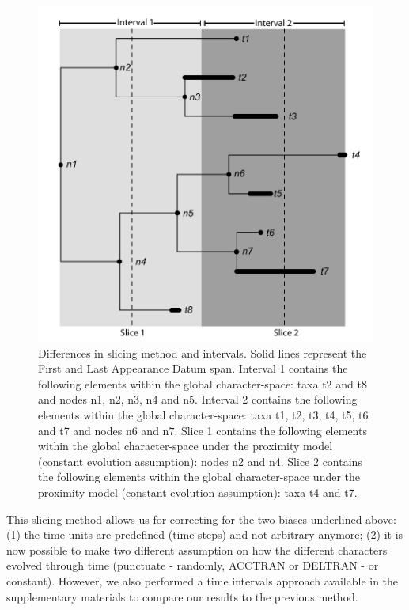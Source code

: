 \documentclass[12pt,letterpaper]{article}
\begin{document}
\begin{figure}[!htbp]
\centering
    \includegraphics[keepaspectratio=true]{Figures/Slicing.pdf}
\caption{Differences in slicing method and intervals. Solid lines represent the First and Last Appearance Datum span. Interval 1 contains the following elements within the global character-space: taxa t2 and t8 and nodes n1, n2, n3, n4 and n5. Interval 2 contains the following elements within the global character-space: taxa t1, t2, t3, t4, t5, t6 and t7 and nodes n6 and n7. Slice 1 contains the following elements within the global character-space under the proximity model (constant evolution assumption): nodes n2 and n4. Slice 2 contains the following elements within the global character-space under the proximity model (constant evolution assumption): taxa t4 and t7.}
\label{slicing}
\end{figure}

This slicing method allows us for correcting for the two biases underlined above: (1) the time units are predefined (time steps) and not arbitrary anymore; (2) it is now possible to make two different assumption on how the different characters evolved through time (punctuate - randomly, ACCTRAN or DELTRAN - or constant). However, we also performed a time intervals approach available in the supplementary materials to compare our results to the previous method.
\end{document}
